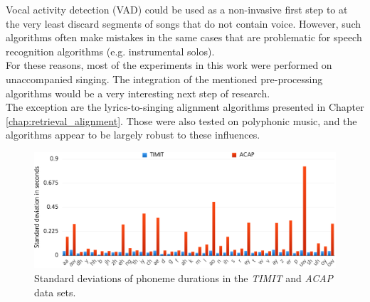 \begin{description}
 Vocal activity detection (VAD) could be used as a non-invasive first step to at the very least discard segments of songs that do not contain voice. However, such algorithms often make mistakes in the same cases that are problematic for speech recognition algorithms (e.g. instrumental solos)\cite{schlueter2016_ismir}.\\
 For these reasons, most of the experiments in this work were performed on unaccompanied singing. The integration of the mentioned pre-processing algorithms would be a very interesting next step of research.\\
 The exception are the lyrics-to-singing alignment algorithms presented in Chapter \ref{chap:retrieval_alignment}. Those were also tested on polyphonic music, and the algorithms appear to be largely robust to these influences.
 \end{description}

\begin{figure}
	\begin{center}
		\includegraphics[width=1\textwidth]{images/phoneme_stats.png}
		\caption{Standard deviations of phoneme durations in the \textit{TIMIT} and \textit{ACAP} data sets.}
		\label{fig:phoneme_stats}
	\end{center}
\end{figure}


